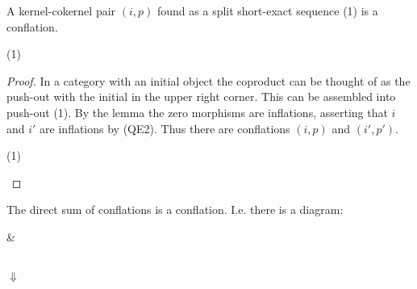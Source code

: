     \begin{corollary}
        A kernel-cokernel pair $(i,p)$ found as a split short-exact sequence (1) is a conflation. 
        
        \begin{center}
            (1)
        \end{center}
    \end{corollary}

    \begin{proof}
        In a category with an initial object the coproduct can be thought of as the push-out with the initial in the upper right corner. This can be assembled into push-out (1).
        By the lemma the zero morphisms are inflations, asserting that $i$ and $i'$ are inflations by (QE2). Thus there are conflations $(i,p)$ and $(i',p')$.

        \begin{center}
            (1)
        \end{center}
    \end{proof}

    \begin{corollary}
        The direct sum of conflations is a conflation. I.e. there is a diagram:
        \begin{center}
             \&
             \\
            $\Downarrow$ \\
        \end{center}
    \end{corollary}

